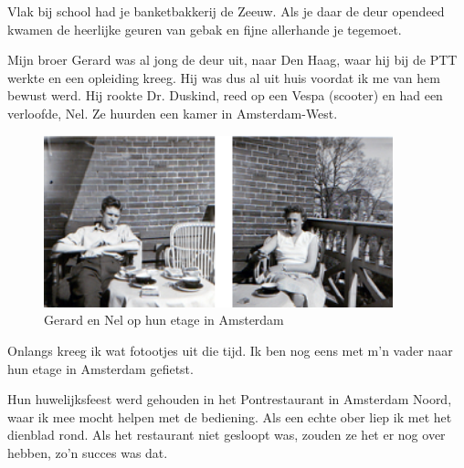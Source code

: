 \documentclass[12pt,twoside, openright]{memoir}
\begin{document}
Vlak bij school had je banketbakkerij de Zeeuw. Als je daar de deur opendeed kwamen de heerlijke geuren van gebak en fijne allerhande je tegemoet.

Mijn broer Gerard was al jong de deur uit, naar Den Haag, waar hij bij de PTT werkte en een opleiding kreeg. Hij was dus al uit huis voordat ik me van hem bewust werd. Hij rookte Dr. Duskind, reed op een Vespa (scooter) en had een verloofde, Nel. Ze huurden een kamer in Amsterdam-West.

\begin{figure}
\centering
\includegraphics[width=0.9\textwidth]{img/ch5/gn0102}
\caption*{\footnotesize Gerard en Nel op hun etage in Amsterdam}
\end{figure}

Onlangs kreeg ik wat fotootjes uit die tijd. Ik ben nog eens met m’n vader naar hun etage in Amsterdam gefietst. 

Hun huwelijksfeest werd gehouden in het Pontrestaurant in Amsterdam Noord, waar ik mee mocht helpen met de bediening. Als een echte ober liep ik met het dienblad rond. Als het restaurant niet gesloopt was, zouden ze het er nog over hebben, zo’n succes was dat.
\end{document}
